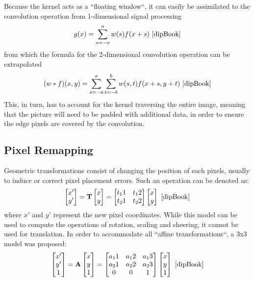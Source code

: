 Because the kernel acts as a ``floating window``, it can easily be assimilated to the convolution operation
from 1-dimensional signal processing \[g(x) = \sum_{s=-a}^{a} w(s)f(x+s) \text{ \cite{dipBook}}\] from which
the formula for the 2-dimensional convolution operation can be extrapolated \[(w*f)(x, y) = \sum_{s=-a}^{a}
	\sum_{t=-b}^{b} w(s, t)f(x + s, y + t)\text{ \cite{dipBook}}\] This, in turn, has to account for the kernel
traversing the entire image, meaning that the picture will need to be padded with additional data, in order to
ensure the edge pixels are covered by the convolution.

\subsection{Pixel Remapping}

Geometric transformations consist of changing the position of each pixels, usually to induce or correct pixel
placement errors. Such an operation can be denoted as:
\[
	\begin{bmatrix}
		x' \\
		y' \\
	\end{bmatrix}
	=
	\mathbf{T}
	\begin{bmatrix}
		x \\
		y \\
	\end{bmatrix}
	=
	\begin{bmatrix}
		t_11 & t_12 \\
		t_21 & t_22 \\
	\end{bmatrix}
	\begin{bmatrix}
		x \\
		y \\
	\end{bmatrix}
	\text{ \cite{dipBook}}
\]
where \(x'\) and \(y'\) represent the new pixel coordinates. While this model can be used to compute the
operations of rotation, scaling and sheering, it cannot be used for translation. In order to accommodate
all ``affine transformations``, a 3x3 model was proposed:
\[
	\begin{bmatrix}
		x' \\
		y' \\
		1  \\
	\end{bmatrix}
	=
	\mathbf{A}
	\begin{bmatrix}
		x \\
		y \\
		1 \\
	\end{bmatrix}
	=
	\begin{bmatrix}
		a_11 & a_12 & a_13 \\
		a_21 & a_22 & a_23 \\
		0    & 0    & 1    \\
	\end{bmatrix}
	\begin{bmatrix}
		x \\
		y \\
		1 \\
	\end{bmatrix}
	\text{ \cite{dipBook}}
\]

